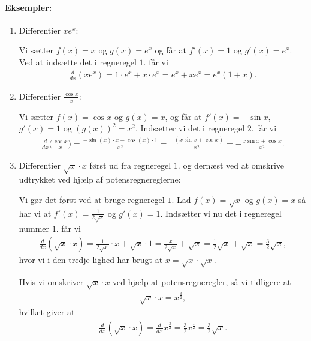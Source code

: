 \paragraph*{Eksempler:}
\begin{enumerate}
\item Differentier $xe^x$:

Vi sætter $f(x)=x$ og $g(x)=e^x$ og får at $f'(x)=1$ og $g'(x)=e^x$. Ved at indsætte det i regneregel $1$. får vi
\begin{align*}
\frac{d}{dx}(xe^x)=1 \cdot e^x + x \cdot e^x = e^x + x e^x = e^x(1+x).
\end{align*}
\item Differentier $\frac{\cos x}{x}$:

Vi sætter $f(x)=\cos x$ og $g(x) = x$, og får at $f'(x) = -\sin x$, $g'(x)=1$ og $(g(x))^2=x^2$. Indsætter vi det i regneregel $2.$ får vi 
\begin{align*}
\frac{d}{dx}\Big(\frac{\cos x}{x}\Big) = \frac{-\sin (x) \cdot x - \cos (x) \cdot 1 }{x^2} = \frac{-(x\sin x + \cos x)}{x^2} = - \frac{x\sin x + \cos x}{x^2}.
\end{align*}
\item Differentier $\sqrt{x} \cdot x$ først ud fra regneregel $1.$ og dernæst ved at omskrive udtrykket ved hjælp af potensregnereglerne:

Vi gør det først ved at bruge regneregel $1.$ Lad $f(x)=\sqrt{x}$ og $g(x)=x$ så har vi at $f'(x)= \frac{1}{2\sqrt{x}}$ og $g'(x)=1$. Indsætter vi nu det i regneregel nummer $1.$ får vi
\begin{align*}
\frac{d}{dx}(\sqrt{x}\cdot x)=\frac{1}{2\sqrt{x}} \cdot x + \sqrt{x} \cdot 1 = \frac{x}{2\sqrt{x}}+\sqrt{x} = \frac{1}{2}\sqrt{x}+\sqrt{x} = \frac{3}{2}\sqrt{x},
\end{align*}
hvor vi i den tredje lighed har brugt at $x=\sqrt{x}\cdot \sqrt{x}$.

Hvis vi omskriver $\sqrt{x}\cdot x$ ved hjælp at potensregneregler, så vi tidligere at 
\begin{align*}
\sqrt{x}\cdot x = x^\frac{3}{2},
\end{align*}
hvilket giver at
\begin{align*}
\frac{d}{dx}(\sqrt{x}\cdot x) = \frac{d}{dx}x^\frac{3}{2}=\frac{3}{2}x^\frac{1}{2}=\frac{3}{2}\sqrt{x}.
\end{align*}
\end{enumerate}